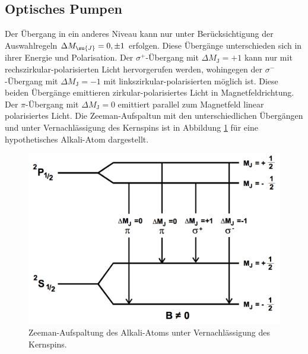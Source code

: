 \newpage
\subsection{Optisches Pumpen}
Der Übergang in ein anderes Niveau kann nur unter Berücksichtigung der Auswahlregeln
$\Delta M_{\su{J}} = 0, \pm1$ erfolgen. Diese Übergänge unterschieden sich in ihrer Energie
und Polarisation.
Der $\sigma^{+}$-Übergang mit $\Delta M_{\text{J}} = +1$ kann nur mit rechszirkular-polarisierten Licht hervorgerufen werden,
wohingegen der $\sigma^{-}$-Übergang mit $\Delta M_{\text{J}} = -1$ mit linkszirkular-polarisierten möglich ist.
Diese beiden Übergänge emittieren zirkular-polarisiertes Licht in Magnetfeldrichtung.
Der $\pi$-Übergang mit $\Delta M_{\text{J}} = 0$ emittiert parallel zum Magnetfeld linear polarisiertes
Licht. \newline
Die Zeeman-Aufspaltun mit den unterschiedlichen Übergängen und unter Vernachlässigung des Kernspins ist in Abbildung \ref{fig:übergänge}
für eine hypothetisches Alkali-Atom dargestellt.
\begin{figure}
    \centering
    \includegraphics[scale = 0.35]{pictures/übergänge.png}
    \caption{Zeeman-Aufspaltung des Alkali-Atoms unter Vernachlässigung des Kernspins.\cite{1}}
    \label{fig:übergänge}
\end{figure}

